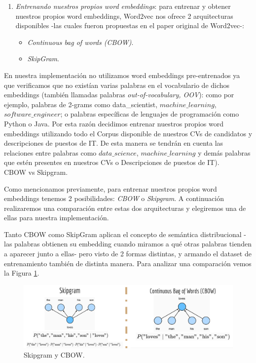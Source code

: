 \documentclass[12pt,a4paper]{article}
\makeatletter
\renewcommand\paragraph{\@startsection{paragraph}{4}{\z@}
            {-2.5ex\@plus -1ex \@minus -.25ex}
            {1.25ex \@plus .25ex}
            {\normalfont\normalsize\bfseries}}
\makeatother
\begin{document}
\begin{sloppypar}
\begin{enumerate}
\cleardoublepage

\item \textit{Entrenando nuestros propios word embeddings}: para entrenar y obtener nuestros propios word embeddings, Word2vec nos ofrece 2 arquitecturas disponibles -las cuales fueron propuestas en el paper original de Word2vec\cite{NLP_11}-:
\begin{itemize}
\item \textit{Continuous bag of words (CBOW)}.
\item \textit{SkipGram}.
\end{itemize}

\end{enumerate}

En nuestra implementación no utilizamos word embeddings pre-entrenados ya que verificamos que no existían varias palabras en el vocabulario de dichos embeddings (también llamadas palabras \textit{out-of-vocabulary, OOV}): como por ejemplo, palabras de 2-grams como data\_scientist, $machine\_learning$, $software\_engineer$; o palabras específicas de lenguajes de programación como Python o Java. Por esta razón decidimos entrenar nuestros propios word embeddings utilizando todo el Corpus disponible de nuestros CVs de candidatos y descripciones de puestos de IT. De esta manera se tendrán en cuenta las relaciones entre palabras como $data\_science$, $machine\_learning$ y demás palabras que estén presentes en nuestros CVs o Descripciones de puestos de IT).
\\

\paragraph{CBOW vs Skipgram.}\label{cbow_vs_skip}

Como mencionamos previamente, para entrenar nuestros propios word embeddings tenemos 2 posibilidades: \textit{CBOW} o \textit{Skipgram}. A continuación realizaremos una comparación entre estas dos arquitecturas y elegiremos una de ellas para nuestra implementación.

Tanto CBOW como SkipGram aplican el concepto de semántica distribucional -las palabras obtienen su embedding cuando miramos a qué otras palabras tienden a aparecer junto a ellas- pero visto de 2 formas distintas, y armando el dataset de entrenamiento también de distinta manera. Para analizar una comparación vemos la Figura \ref{fig:Imagen_NLP_15}.

\begin{figure}[H]    
 \centering
 \includegraphics[width=1\textwidth]{images/NLP/15.png}
 \caption{Skipgram y CBOW\cite{NLP_27}.}
 \label{fig:Imagen_NLP_15}
\end{figure}


\end{sloppypar}
\end{document}
